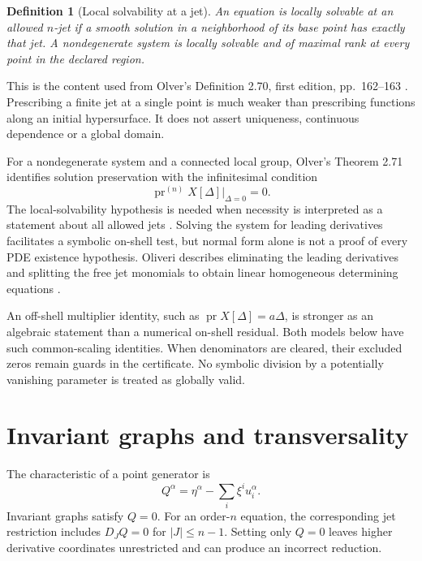 \documentclass[12pt,a4paper,oneside]{report}
\numberwithin{equation}{chapter}
\newtheorem{definition}[theorem]{Definition}
\newcommand{\pr}{\operatorname{pr}}
\begin{document}
\begin{definition}[Local solvability at a jet]
An equation is locally solvable at an allowed $n$-jet if a smooth solution in
a neighborhood of its base point has exactly that jet. A nondegenerate system
is locally solvable and of maximal rank at every point in the declared
region.
\end{definition}
This is the content used from Olver's Definition 2.70, first edition,
pp.~162--163 \cite{olver1986}. Prescribing a finite jet at a single point
is much weaker than prescribing functions along an initial hypersurface.
It does not assert uniqueness, continuous dependence or a global domain.

For a nondegenerate system and a connected local group, Olver's Theorem 2.71
identifies solution preservation with the infinitesimal condition
\begin{equation}\label{eq:criterion}
\pr^{(n)}X[\Delta]\big|_{\Delta=0}=0.
\end{equation}
The local-solvability hypothesis is needed when necessity is interpreted as
a statement about all allowed jets \cite[p.~165]{olver1986}. Solving the
system for leading derivatives facilitates a symbolic on-shell test, but
normal form alone is not a proof of every PDE existence hypothesis.
Oliveri describes eliminating the leading derivatives and splitting the free
jet monomials to obtain linear homogeneous determining equations
\cite[Sec.~4.3, pp.~93--97]{oliveri2026}.

An off-shell multiplier identity, such as $\pr X[\Delta]=a\Delta$, is stronger
as an algebraic statement than a numerical on-shell residual. Both models
below have such common-scaling identities. When denominators are cleared,
their excluded zeros remain guards in the certificate. No symbolic division
by a potentially vanishing parameter is treated as globally valid.

\section{Invariant graphs and transversality}
The characteristic of a point generator is
\begin{equation}\label{eq:Q}
Q^\alpha=\eta^\alpha-\sum_i\xi^i u^\alpha_i.
\end{equation}
Invariant graphs satisfy $Q=0$. For an order-$n$ equation, the corresponding
jet restriction includes $D_JQ=0$ for $|J|\leq n-1$. Setting only $Q=0$ leaves
higher derivative coordinates unrestricted and can produce an incorrect
reduction.
\end{document}
